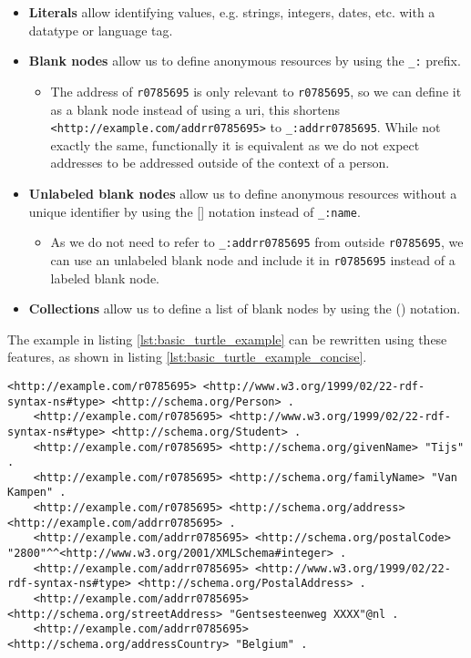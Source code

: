 \begin{itemize}
\begin{itemize}
          \end{itemize}
    \item \textbf{Literals} allow identifying values, e.g. strings, integers, dates, etc. with a datatype or language tag.
    \item \textbf{Blank nodes} allow us to define anonymous resources by using the \texttt{\_:} prefix.
          \begin{itemize}
              \item The address of \texttt{r0785695} is only relevant to \texttt{r0785695}, so we can define it as a blank node instead of using a \acrshort{uri}, this shortens \texttt{<http://example.com/addrr0785695>} to \texttt{\_:addrr0785695}. While not exactly the same, functionally it is equivalent as we do not expect addresses to be addressed outside of the context of a person.
          \end{itemize}
    \item \textbf{Unlabeled blank nodes} allow us to define anonymous resources without a unique identifier by using the [] notation instead of \texttt{\_:name}.
          \begin {itemize}
    \item As we do not need to refer to \texttt{\_:addrr0785695} from outside \texttt{r0785695}, we can use an unlabeled blank node and include it in \texttt{r0785695} instead of a labeled blank node.
\end{itemize}
\item \textbf{Collections} allow us to define a list of blank nodes by using the () notation.
\end{itemize}
The example in listing \ref{lst:basic_turtle_example} can be rewritten using these features, as shown in listing \ref{lst:basic_turtle_example_concise}.


\begin{lstlisting}[caption={Basic naive turtle document}, label={lst:basic_turtle_example}, captionpos=b, breaklines=true, basicstyle=\small]
    <http://example.com/r0785695> <http://www.w3.org/1999/02/22-rdf-syntax-ns#type> <http://schema.org/Person> .
    <http://example.com/r0785695> <http://www.w3.org/1999/02/22-rdf-syntax-ns#type> <http://schema.org/Student> .
    <http://example.com/r0785695> <http://schema.org/givenName> "Tijs" .
    <http://example.com/r0785695> <http://schema.org/familyName> "Van Kampen" .
    <http://example.com/r0785695> <http://schema.org/address> <http://example.com/addrr0785695> .
    <http://example.com/addrr0785695> <http://schema.org/postalCode> "2800"^^<http://www.w3.org/2001/XMLSchema#integer> .
    <http://example.com/addrr0785695> <http://www.w3.org/1999/02/22-rdf-syntax-ns#type> <http://schema.org/PostalAddress> .
    <http://example.com/addrr0785695> <http://schema.org/streetAddress> "Gentsesteenweg XXXX"@nl .
    <http://example.com/addrr0785695> <http://schema.org/addressCountry> "Belgium" .
\end{lstlisting}

